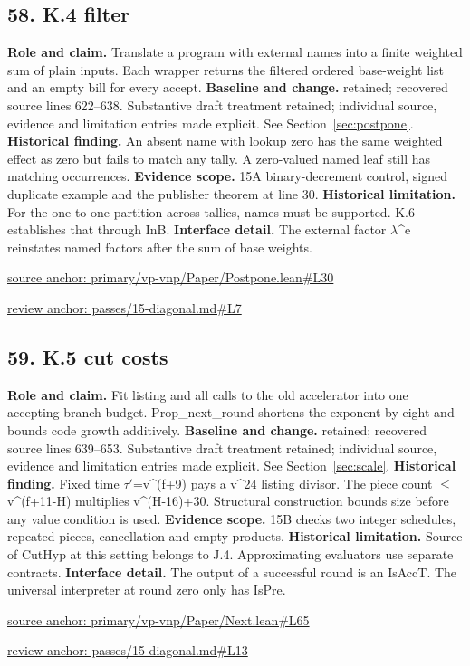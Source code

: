 \documentclass[11pt,letterpaper]{article}
\theoremstyle{definition}\newtheorem{definition}[theorem]{Definition}\newtheorem{example}[theorem]{Example}
\theoremstyle{remark}\newtheorem{remark}[theorem]{Remark}
\begin{document}
\subsection*{58. K.4 filter}
\textbf{Role and claim.} Translate a program with external names into a finite weighted sum of plain inputs. Each wrapper returns the filtered ordered base-weight list and an empty bill for every accept.
\textbf{Baseline and change.} retained; recovered source lines 622--638. Substantive draft treatment retained; individual source, evidence and limitation entries made explicit. See Section~\ref{sec:postpone}.
\textbf{Historical finding.} An absent name with lookup zero has the same weighted effect as zero but fails to match any tally. A zero-valued named leaf still has matching occurrences.
\textbf{Evidence scope.} 15A binary-decrement control, signed duplicate example and the publisher theorem at line 30.
\textbf{Historical limitation.} For the one-to-one partition across tallies, names must be supported. K.6 establishes that through InB.
\textbf{Interface detail.} The external factor \ensuremath{\lambda}\textasciicircum{}e reinstates named factors after the sum of base weights.
\par\href{https://github.com/nousentllc/VP-VNP-Review/blob/8a7976933b6b2b4ffda1ad3a0dfb5fc6b6f023e8/primary/vp-vnp/Paper/Postpone.lean\#L30}{source anchor: primary/vp-vnp/Paper/Postpone.lean\#L30}
\par\href{https://github.com/nousentllc/VP-VNP-Review/blob/8a7976933b6b2b4ffda1ad3a0dfb5fc6b6f023e8/passes/15-diagonal.md\#L7}{review anchor: passes/15-diagonal.md\#L7}
\goodbreak
\subsection*{59. K.5 cut costs}
\textbf{Role and claim.} Fit listing and all calls to the old accelerator into one accepting branch budget. Prop\_next\_round shortens the exponent by eight and bounds code growth additively.
\textbf{Baseline and change.} retained; recovered source lines 639--653. Substantive draft treatment retained; individual source, evidence and limitation entries made explicit. See Section~\ref{sec:scale}.
\textbf{Historical finding.} Fixed time \ensuremath{\tau}\ensuremath{\prime}=v\textasciicircum{}(f+9) pays a v\textasciicircum{}24 listing divisor. The piece count \ensuremath{\le}v\textasciicircum{}(f+11-H) multiplies v\textasciicircum{}(H-16)+30. Structural construction bounds size before any value condition is used.
\textbf{Evidence scope.} 15B checks two integer schedules, repeated pieces, cancellation and empty products.
\textbf{Historical limitation.} Source of CutHyp at this setting belongs to J.4. Approximating evaluators use separate contracts.
\textbf{Interface detail.} The output of a successful round is an IsAccT. The universal interpreter at round zero only has IsPre.
\par\href{https://github.com/nousentllc/VP-VNP-Review/blob/8a7976933b6b2b4ffda1ad3a0dfb5fc6b6f023e8/primary/vp-vnp/Paper/Next.lean\#L65}{source anchor: primary/vp-vnp/Paper/Next.lean\#L65}
\par\href{https://github.com/nousentllc/VP-VNP-Review/blob/8a7976933b6b2b4ffda1ad3a0dfb5fc6b6f023e8/passes/15-diagonal.md\#L13}{review anchor: passes/15-diagonal.md\#L13}
\goodbreak
\end{document}
